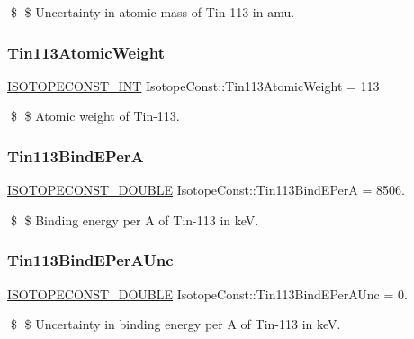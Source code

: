 \$ \$ Uncertainty in atomic mass of Tin-\/113 in amu. \mbox{\label{group___isotope_const-_tin-_sn113_ga3fa8859eecbed681b8bd724b4032d731}} 
\subsubsection{\texorpdfstring{Tin113\+Atomic\+Weight}{Tin113AtomicWeight}}
{\footnotesize\ttfamily \mbox{\hyperlink{group___isotope_const-_macros_ga5f18360b3e99483a35c32d789e62621c}{I\+S\+O\+T\+O\+P\+E\+C\+O\+N\+S\+T\+\_\+\+I\+NT}} Isotope\+Const\+::\+Tin113\+Atomic\+Weight = 113}

\$ \$ Atomic weight of Tin-\/113. \mbox{\label{group___isotope_const-_tin-_sn113_gaa33e68d92b8bc9fd44a84cdb75eb656d}} 
\subsubsection{\texorpdfstring{Tin113\+Bind\+E\+PerA}{Tin113BindEPerA}}
{\footnotesize\ttfamily \mbox{\hyperlink{group___isotope_const-_macros_ga8f45a7272ce02c0b4c65c44636ed719a}{I\+S\+O\+T\+O\+P\+E\+C\+O\+N\+S\+T\+\_\+\+D\+O\+U\+B\+LE}} Isotope\+Const\+::\+Tin113\+Bind\+E\+PerA = 8506.}

\$ \$ Binding energy per A of Tin-\/113 in keV. \mbox{\label{group___isotope_const-_tin-_sn113_ga6bba9fced65f51022b07a6ec59fa9809}} 
\subsubsection{\texorpdfstring{Tin113\+Bind\+E\+Per\+A\+Unc}{Tin113BindEPerAUnc}}
{\footnotesize\ttfamily \mbox{\hyperlink{group___isotope_const-_macros_ga8f45a7272ce02c0b4c65c44636ed719a}{I\+S\+O\+T\+O\+P\+E\+C\+O\+N\+S\+T\+\_\+\+D\+O\+U\+B\+LE}} Isotope\+Const\+::\+Tin113\+Bind\+E\+Per\+A\+Unc = 0.}

\$ \$ Uncertainty in binding energy per A of Tin-\/113 in keV. \mbox{\label{group___isotope_const-_tin-_sn113_ga901993f05450f641e8e24a607eec07ba}} 
